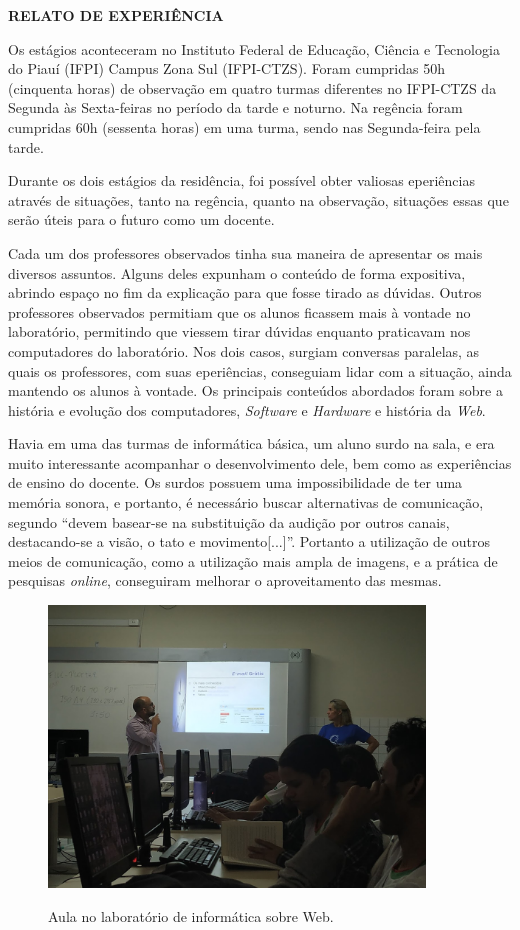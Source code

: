 \begin{OnehalfSpace}

    \noindent\textbf{RELATO DE EXPERIÊNCIA} 

    Os estágios aconteceram no Instituto Federal de Educação, Ciência e Tecnologia
    do Piauí (IFPI) Campus Zona Sul (IFPI-CTZS). Foram cumpridas 50h (cinquenta horas) de observação em quatro turmas diferentes no IFPI-CTZS da Segunda às Sexta-feiras no período da tarde e noturno. Na regência foram cumpridas 60h (sessenta horas) em uma turma, sendo nas Segunda-feira pela tarde. 
    
    Durante os dois estágios da residência, foi possível obter valiosas eperiências através de situações, tanto na regência, quanto na observação, situações essas que serão úteis para o futuro como um docente.

    Cada um dos professores observados tinha sua maneira de apresentar os mais diversos assuntos. Alguns deles expunham o conteúdo de forma expositiva, abrindo espaço no fim da explicação para que fosse tirado as dúvidas. Outros professores observados permitiam que os alunos ficassem mais à vontade no laboratório, permitindo que viessem tirar dúvidas enquanto praticavam nos computadores do laboratório. Nos dois casos, surgiam conversas paralelas, as quais os professores, com suas eperiências, conseguiam lidar com a situação, ainda mantendo os alunos à vontade. Os principais conteúdos abordados foram sobre a história e evolução dos computadores, \textit{Software} e \textit{Hardware} e história da \textit{Web}.

    Havia em uma das turmas de informática básica, um aluno surdo na sala, e era muito interessante acompanhar o desenvolvimento dele, bem como as experiências de ensino do docente. Os surdos possuem uma impossibilidade de ter uma memória sonora, e portanto, é necessário buscar alternativas de comunicação, segundo \cite{rinaldi1997} “devem basear-se na substituição da audição por outros canais, destacando-se a visão, o tato e movimento[...]”. Portanto a utilização de outros meios de comunicação, como a utilização mais ampla de imagens, e a prática de pesquisas \textit{online}, conseguiram melhorar o aproveitamento das mesmas.

    \begin{figure}[H]
        \centering
        \caption{Aula no laboratório de informática sobre Web.}
        \includegraphics[width=100mm]{img/obs1-jef.jpg}
        \label{figura}
    \end{figure}


\end{OnehalfSpace}

